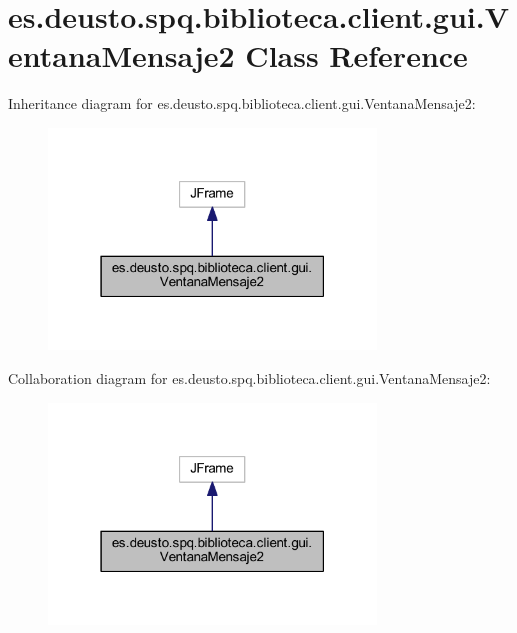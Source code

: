 \hypertarget{classes_1_1deusto_1_1spq_1_1biblioteca_1_1client_1_1gui_1_1_ventana_mensaje2}{}\section{es.\+deusto.\+spq.\+biblioteca.\+client.\+gui.\+Ventana\+Mensaje2 Class Reference}
\label{classes_1_1deusto_1_1spq_1_1biblioteca_1_1client_1_1gui_1_1_ventana_mensaje2}


Inheritance diagram for es.\+deusto.\+spq.\+biblioteca.\+client.\+gui.\+Ventana\+Mensaje2\+:
\nopagebreak
\begin{figure}[H]
\begin{center}
\leavevmode
\includegraphics[width=247pt]{classes_1_1deusto_1_1spq_1_1biblioteca_1_1client_1_1gui_1_1_ventana_mensaje2__inherit__graph}
\end{center}
\end{figure}


Collaboration diagram for es.\+deusto.\+spq.\+biblioteca.\+client.\+gui.\+Ventana\+Mensaje2\+:
\nopagebreak
\begin{figure}[H]
\begin{center}
\leavevmode
\includegraphics[width=247pt]{classes_1_1deusto_1_1spq_1_1biblioteca_1_1client_1_1gui_1_1_ventana_mensaje2__coll__graph}
\end{center}
\end{figure}
